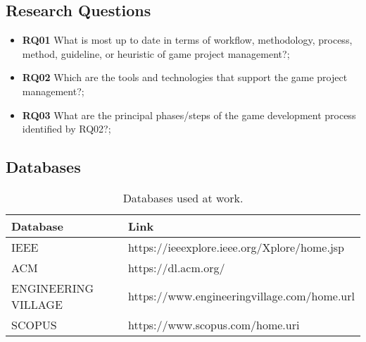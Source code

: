 \documentclass [11pt]{article}
\begin{document}
\subsection{Research Questions}
\begin{itemize}
	\item \textbf{RQ01} What is most up to date in terms of workflow, methodology, process, method, guideline, or heuristic of game project management?;
	\item \textbf{RQ02} Which are the tools and technologies that support the game project management?;
	\item \textbf{RQ03} What are the principal phases/steps of the game development process identified by RQ02?;
\end{itemize}

\subsection{Databases}
\begin{table}[!htb]
\caption[Databases used at work]{Databases used at work.}
\label{tab:databases}
\centering
\begin{tabular}{@{}ll@{}}
\toprule
\textbf{Database} & \textbf{Link} \\ \midrule
IEEE & https://ieeexplore.ieee.org/Xplore/home.jsp \\ 
ACM & https://dl.acm.org/ \\ 
ENGINEERING VILLAGE & https://www.engineeringvillage.com/home.url \\ 
SCOPUS & https://www.scopus.com/home.uri \\ \bottomrule 
\end{tabular}
\end{table}
\end{document}
